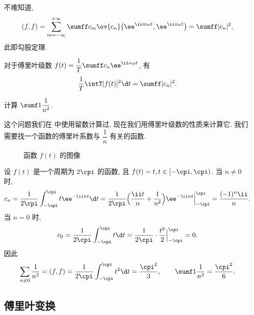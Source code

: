 不难知道,
\[
  (f,f)
  =\sum_{m=-\infty}^{+\infty}\sumff 
    c_m\ov{c_n}\bigl(\ee^{\ii m\omega t},\ee^{\ii n\omega t}\bigr)
  =\sumff |c_n|^2,
\]
此即勾股定理.

\begin{theorem}[帕塞瓦尔恒等式]
  对于傅里叶级数 $f(t)=\dfrac 1T\sumff c_n \ee^{\ii n\omega t}$, 有
  \[
     \frac1{T}\intT |f(t)|^2\d t
    =\sumff |c_n|^2.
  \]
\end{theorem}

\begin{example}
  计算 $\sumf1 \dfrac1{n^2}$.
\end{example}

这个问题我们在 中使用留数计算过, 现在我们用傅里叶级数的性质来计算它.
我们需要找一个函数的傅里叶系数与 $\dfrac1{n}$ 有关的函数.

\begin{figure}[!htb]
  \centering
  \caption{函数 $f(t)$ 的图像}
\end{figure}

\begin{solution}
  设 $f(t)$ 是一个周期为 $2\cpi$ 的函数, 且 $f(t)=t,t\in[-\cpi,\cpi)$.
  当 $n\neq0$ 时,
  \[
    c_n=\frac1{2\cpi}\int_{-\cpi}^\cpi t\ee^{-\ii nt}\d t
    =\frac1{2\cpi}\Bigl(\frac{\ii t}n+\frac1{n^2}\Bigr)\ee^{-\ii nt}\Big|_{-\cpi}^\cpi
    =\frac{(-1)^n\ii}n.
  \]
  当 $n=0$ 时,
  \[
    c_0=\frac1{2\cpi}\int_{-\cpi}^\cpi t\d t
    =\frac1{2\cpi}\cdot\frac{t^2}2\Big|_{-\cpi}^\cpi
    =0.
  \]
  因此
  \[
     \sum_{n\neq 0}\frac1{n^2}
    =(f,f)
    =\frac1{2\cpi}\int_{-\cpi}^{\cpi}t^2\d t
    =\frac{\cpi^2}3,
    \qquad
    \sumf1 \frac1{n^2}=\frac{\cpi^2}6.
  \]
\end{solution}


\subsection{傅里叶变换}

